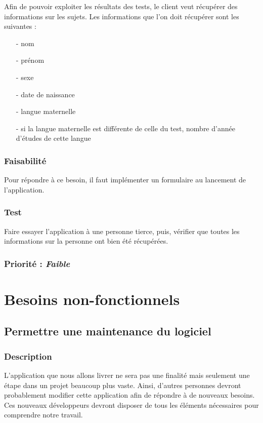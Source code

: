 Afin de pouvoir exploiter les résultats des tests, le client veut récupérer des informations sur les sujets.
Les informations que l’on doit récupérer sont les suivantes :\\
\begin{itemize}
  \item[-]  nom
  \item[-]  prénom
  \item[-]  sexe
  \item[-]  date de naissance
  \item[-]  langue maternelle
  \item[-]  si la langue maternelle est différente de celle du test, nombre d’année d’études de cette langue
\end{itemize}

\subsubsection{Faisabilité}
    
Pour répondre à ce besoin, il faut implémenter un formulaire au lancement de l’application.

\subsubsection{Test}

Faire essayer l’application à une personne tierce, puis, vérifier que toutes les informations sur la personne ont bien été récupérées.

\subsubsection{Priorité : \textit{Faible}}


\section{Besoins non-fonctionnels}\label{besoins_non-fonctionnels}

\subsection{Permettre une maintenance du logiciel}

\subsubsection{Description}

L’application que nous allons livrer ne sera pas une finalité mais seulement une étape dans un projet beaucoup plus vaste. Ainsi, d’autres personnes devront probablement modifier cette application afin de répondre à de nouveaux besoins. Ces nouveaux développeurs devront disposer de tous les éléments nécessaires pour comprendre notre travail.                                                                                                                                                                                                                                                                                        
